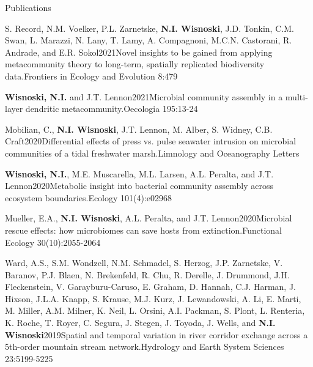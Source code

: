 \documentclass{resume} %
\begin{document}
\begin{rhangSection}{Publications}
\begin{Publication}{S. Record, N.M. Voelker, P.L. Zarnetske, {\bf N.I. Wisnoski}, J.D. Tonkin, C.M. Swan, L. Marazzi, N. Lany, T. Lamy, A. Compagnoni, M.C.N. Castorani, R. Andrade, and E.R. Sokol}{2021}{Novel insights to be gained from applying metacommunity theory to long-term, spatially replicated biodiversity data.}{Frontiers in Ecology and Evolution 8:479}
\end{Publication}

\begin{Publication}{{\bf Wisnoski, N.I.} and J.T. Lennon}{2021}{Microbial community assembly in a multi-layer dendritic metacommunity.}{Oecologia 195:13-24}
\end{Publication}

\begin{Publication}{Mobilian, C., {\bf N.I. Wisnoski}, J.T. Lennon, M. Alber, S. Widney, C.B. Craft}{2020}{Differential effects of press vs. pulse seawater intrusion on microbial communities of a tidal freshwater marsh.}{Limnology and Oceanography Letters}
\end{Publication}

\begin{Publication}{{\bf Wisnoski, N.I.}, M.E. Muscarella, M.L. Larsen, A.L. Peralta, and J.T. Lennon}{2020}{Metabolic insight into bacterial community assembly across ecosystem boundaries.}{Ecology 101(4):e02968}
\end{Publication}

\begin{Publication}{Mueller, E.A., {\bf N.I. Wisnoski}, A.L. Peralta, and J.T. Lennon}{2020}{Microbial rescue effects: how microbiomes can save hosts from extinction.}{Functional Ecology 30(10):2055-2064}
\end{Publication}

\begin{Publication}{Ward, A.S., S.M. Wondzell, N.M. Schmadel, S. Herzog, J.P. Zarnetske, V. Baranov, P.J. Blaen, N. Brekenfeld, R. Chu, R. Derelle, J. Drummond, J.H. Fleckenstein, V. Garayburu-Caruso, E. Graham, D. Hannah, C.J. Harman, J. Hixson, J.L.A. Knapp, S. Krause, M.J. Kurz, J. Lewandowski, A. Li, E. Marti, M. Miller, A.M. Milner, K. Neil, L. Orsini, A.I. Packman, S. Plont, L. Renteria, K. Roche, T. Royer, C. Segura, J. Stegen, J. Toyoda, J. Wells, and {\bf N.I. Wisnoski}}{2019}{Spatial and temporal variation in river corridor exchange across a 5th-order mountain stream network.}{Hydrology and Earth System Sciences 23:5199-5225} 
\end{Publication}


\end{rhangSection}
\end{document}
